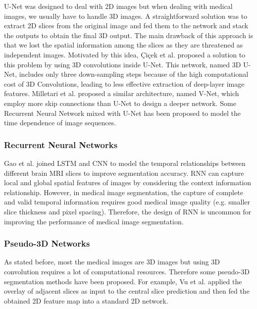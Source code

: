 U-Net was designed to deal with 2D images but when dealing with medical images,
we usually have to handle 3D images. A straightforward solution was to extract 2D
slices from the original image and fed them to the network and stack the outputs to
obtain the final 3D output.
The main drawback of this approach is that we lost the spatial information among
the slices as they are threatened as independent images. Motivated by this idea,
Çiçek et al. proposed a solution to this problem by using 3D convolutions inside
U-Net. This network, named 3D U-Net, includes only three down-sampling steps
because of the high computational cost of 3D Convolutions, leading to less
effective extraction of deep-layer image features.
Milletari et al. proposed a similar architecture, named V-Net, which employ more
skip connections than U-Net to design a deeper network.
Some Recurrent Neural Network mixed with U-Net has been proposed to model the
time dependence of image sequences.

\subsubsection{Recurrent Neural Networks}
Gao et al. joined LSTM and CNN to model the temporal relationships between
different brain MRI slices to improve segmentation accuracy. RNN can
capture local and global spatial features of images by considering the context
information
relationship. However, in medical image segmentation, the capture of complete
and valid temporal information requires good medical image quality (e.g. smaller
slice thickness and pixel spacing). Therefore, the design of RNN is uncommon for
improving the performance of medical image segmentation.

\subsubsection{Pseudo-3D Networks}
As stated before, most the medical images are 3D images but using 3D
convolution requires a lot of computational resources. Therefore some pseudo-3D
segmentation methods have been proposed. For example, Vu et al. applied the
overlay of adjacent slices as input to the central slice prediction and then
fed the obtained 2D feature map into a standard 2D network.

